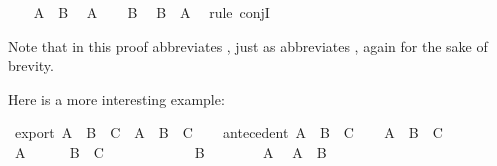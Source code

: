 \begin{isabellebody}
\isanewline
\ \ \isamarkupfalse%
\ {\isacharbackquoteopen}A\ {\isasymand}\ B{\isacharbackquoteclose}\ \isamarkupfalse%
\ {\isachardoublequoteopen}A{\isachardoublequoteclose}\isacommand{{\isachardot}{\isachardot}}\isamarkupfalse%
\isanewline
\ \ \isamarkupfalse%
\ {\isacharbackquoteopen}B{\isacharbackquoteclose}\ \isamarkupfalse%
\ {\isachardoublequoteopen}B\ {\isasymand}\ A{\isachardoublequoteclose}\ \isamarkupfalse%
\ {\isacharparenleft}rule\ conjI{\isacharparenright}\isanewline
{}\isamarkupfalse%
%
\endisatagproof
{\isafoldproof}%
%
\isadelimproof
%
\endisadelimproof
%
\begin{isamarkuptext}%
Note that  in this proof abbreviates , just as 
abbreviates , again for the sake of brevity.%
\end{isamarkuptext}\isamarkuptrue%
%
\begin{isamarkuptext}%
Here is a more interesting example:%
\end{isamarkuptext}\isamarkuptrue%
\isamarkupfalse%
\ export{\isacharcolon}\ {\isachardoublequoteopen}{\isacharparenleft}A\ {\isasymand}\ B\ {\isasymlongrightarrow}\ C{\isacharparenright}\ {\isasymlongrightarrow}\ {\isacharparenleft}A\ {\isasymlongrightarrow}\ B\ {\isasymlongrightarrow}\ C{\isacharparenright}{\isachardoublequoteclose}\isanewline
%
\isadelimproof
%
\endisadelimproof
%
\isatagproof
{}\isamarkupfalse%
\isanewline
\ \ \isamarkupfalse%
\ antecedent{\isacharcolon}\ {\isachardoublequoteopen}A\ {\isasymand}\ B\ {\isasymlongrightarrow}\ C{\isachardoublequoteclose}\isanewline
\ \ \isamarkupfalse%
\ {\isachardoublequoteopen}A\ {\isasymlongrightarrow}\ B\ {\isasymlongrightarrow}\ C{\isachardoublequoteclose}\isanewline
\ \ \isamarkupfalse%
\isanewline
\ \ \ \ \isamarkupfalse%
\ {\isachardoublequoteopen}A{\isachardoublequoteclose}\isanewline
\ \ \ \ \isamarkupfalse%
\ {\isachardoublequoteopen}B\ {\isasymlongrightarrow}\ C{\isachardoublequoteclose}\isanewline
\ \ \ \ \isamarkupfalse%
\isanewline
\ \ \ \ \ \ \isamarkupfalse%
\ {\isachardoublequoteopen}B{\isachardoublequoteclose}\isanewline
\ \ \ \ \ \ \isamarkupfalse%
\ {\isacharbackquoteopen}A{\isacharbackquoteclose}\ \isamarkupfalse%
\ {\isachardoublequoteopen}A\ {\isasymand}\ B{\isachardoublequoteclose}\ \isamarkupfalse%

\end{isabellebody}
